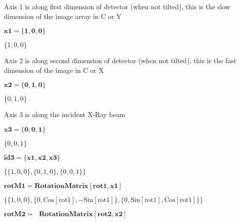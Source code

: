 \documentclass{article}
\begin{document}
Axis 1 is along first dimension of detector (when not tilted), this is the slow dimension of the image array in C or Y

\begin{doublespace}
\noindent\(\pmb{\text{x1}=\{1,0,0\}}\)
\end{doublespace}

\begin{doublespace}
\noindent\(\{1,0,0\}\)
\end{doublespace}

 Axis 2 is along second dimension of detector (when not tilted), this is the fast dimension of the image in C or X

\begin{doublespace}
\noindent\(\pmb{\text{x2}=\{0,1,0\}}\)
\end{doublespace}

\begin{doublespace}
\noindent\(\{0,1,0\}\)
\end{doublespace}

Axis 3 is along the incident X-Ray beam

\begin{doublespace}
\noindent\(\pmb{\text{x3}=\{0,0,1\}}\)
\end{doublespace}

\begin{doublespace}
\noindent\(\{0,0,1\}\)
\end{doublespace}

\begin{doublespace}
\noindent\(\pmb{\text{id3}=\{\text{x1},\text{x2},\text{x3}\}}\)
\end{doublespace}

\begin{doublespace}
\noindent\(\{\{1,0,0\},\{0,1,0\},\{0,0,1\}\}\)
\end{doublespace}

\begin{doublespace}
\noindent\(\pmb{\text{rotM1}=\text{RotationMatrix}[\text{rot1},\text{x1}]}\)
\end{doublespace}

\begin{doublespace}
\noindent\(\{\{1,0,0\},\{0,\text{Cos}[\text{rot1}],-\text{Sin}[\text{rot1}]\},\{0,\text{Sin}[\text{rot1}],\text{Cos}[\text{rot1}]\}\}\)
\end{doublespace}

\begin{doublespace}
\noindent\(\pmb{\text{rotM2} =\text{  }\text{RotationMatrix}[\text{rot2},\text{x2}]}\)
\end{doublespace}
\end{document}
